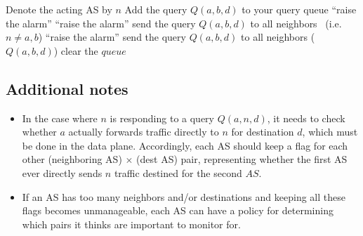 \documentclass[12pt]{article}
\begin{document}
  \begin{algorithmic}
    \State Denote the acting AS by $n$
        \State Add the query $Q(a,b,d)$ to your query queue
      \EndFor
    \EndFunction
        \State \Return
      \EndIf
      	  \State ``raise the alarm''
	\EndIf
	\State \Return
      \EndIf
          \State``raise the alarm''
        \EndIf
        \State send the query $Q(a,b,d)$ to all neighbors
      \Else \ (i.e. $n \neq a,b$)
          \State ``raise the alarm''
        \Else
        \State send the query $Q(a,b,d)$ to all neighbors
        \EndIf
      \EndIf
    \EndFunction
        ($Q(a,b,d)$)
      \EndFor
      \State clear the $queue$
    \EndFunction

  \end{algorithmic}
  
  \subsection{Additional notes}
  \begin{itemize}
  \item In the case where $n$ is responding to a query $Q(a,n,d)$, it needs to check whether $a$ actually forwards traffic directly to $n$ for destination $d$, which must be done in the data plane. Accordingly, each AS should keep a flag for each other (neighboring AS) $\times$ (dest AS) pair, representing whether the first AS ever directly sends $n$ traffic destined for the second $AS$.
  \item If an AS has too many neighbors and/or destinations and keeping all these flags becomes unmanageable, each AS can have a policy for determining which pairs it thinks are important to monitor for.
  \end{itemize}

\begin{comment}
We can put all the details of the protocol implementation here

  One subtlety to note: the ASes should maybe start out by asking
  \emph{themselves} whatever next-hop queries they have. E.g. in {\sc GrandMa},
  node $a$ can immediately tell that $m$ isn't telling the truth,
  because $m$ says he forwards traffic to $a$, but doesn't.
    
\end{comment}
\end{document}
